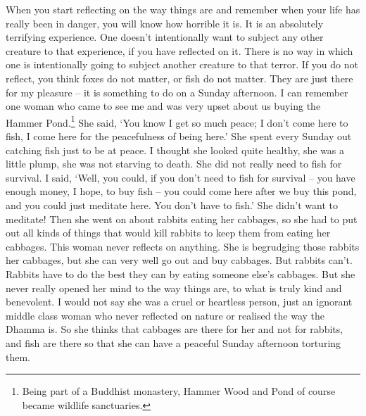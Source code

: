 When you start reflecting on the way things are and remember when your life has really been in danger, you will know how horrible it is. It is an absolutely terrifying experience. One doesn't intentionally want to subject any other creature to that experience, if you have reflected on it. There is no way in which one is intentionally going to subject another creature to that terror. If you do not reflect, you think foxes do not matter, or fish do not matter. They are just there for my pleasure -- it is something to do on a Sunday afternoon. I can remember one woman who came to see me and was very upset about us buying the Hammer Pond.\footnote{Being part of a Buddhist monastery, Hammer Wood and Pond of course became wildlife sanctuaries.} She said, `You know I get so much peace; I don't come here to fish, I come here for the peacefulness of being here.' She spent every Sunday out catching fish just to be at peace. I thought she looked quite healthy, she was a little plump, she was not starving to death. She did not really need to fish for survival. I said, `Well, you could, if you don't need to fish for survival -- you have enough money, I hope, to buy fish -- you could come here after we buy this pond, and you could just meditate here. You don't have to fish.' She didn't want to meditate! Then she went on about rabbits eating her cabbages, so she had to put out all kinds of things that would kill rabbits to keep them from eating her cabbages. This woman never reflects on anything. She is begrudging those rabbits her cabbages, but she can very well go out and buy cabbages. But rabbits can't. Rabbits have to do the best they can by eating someone else's cabbages. But she never really opened her mind to the way things are, to what is truly kind and benevolent. I would not say she was a cruel or heartless person, just an ignorant middle class woman who never reflected on nature or realised the way the Dhamma is. So she thinks that cabbages are there for her and not for rabbits, and fish are there so that she can have a peaceful Sunday afternoon torturing them.

